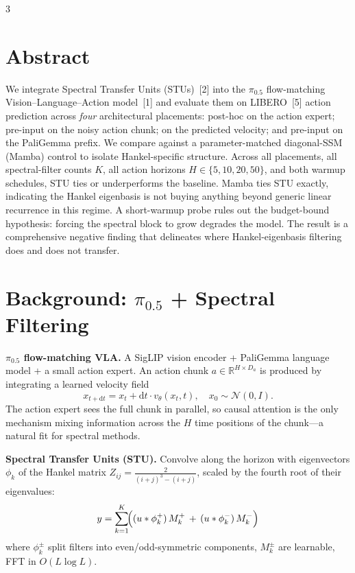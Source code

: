 \documentclass[landscape]{article}
\begin{document}
\begin{multicols}{3}

\section*{Abstract}

We integrate Spectral Transfer Units (STUs)~[2] into the $\pi_{0.5}$ flow-matching Vision--Language--Action model~[1] and evaluate them on LIBERO~[5] action prediction across \emph{four} architectural placements: post-hoc on the action expert; pre-input on the noisy action chunk; on the predicted velocity; and pre-input on the PaliGemma prefix. We compare against a parameter-matched diagonal-SSM (Mamba) control to isolate Hankel-specific structure. Across all placements, all spectral-filter counts $K$, all action horizons $H \in \{5,10,20,50\}$, and both warmup schedules, STU ties or underperforms the baseline. Mamba ties STU exactly, indicating the Hankel eigenbasis is not buying anything beyond generic linear recurrence in this regime. A short-warmup probe rules out the budget-bound hypothesis: forcing the spectral block to grow degrades the model. The result is a comprehensive negative finding that delineates where Hankel-eigenbasis filtering does and does not transfer.

\section*{Background: $\pi_{0.5}$ + Spectral Filtering}

\textbf{$\pi_{0.5}$ flow-matching VLA.} A SigLIP vision encoder + PaliGemma language model + a small action expert. An action chunk $a \in \mathbb{R}^{H \times D_a}$ is produced by integrating a learned velocity field
$$x_{t+\mathrm{d}t} = x_t + \mathrm{d}t \cdot v_\theta(x_t, t), \quad x_0 \sim \mathcal{N}(0, I).$$
The action expert sees the full chunk in parallel, so causal attention is the only mechanism mixing information across the $H$ time positions of the chunk---a natural fit for spectral methods.

\textbf{Spectral Transfer Units (STU).} Convolve along the horizon with eigenvectors $\phi_k$ of the Hankel matrix $Z_{ij} = \frac{2}{(i+j)^3 - (i+j)}$, scaled by the fourth root of their eigenvalues:
$$y = \sum_{k=1}^{K} \!\Bigl( (u * \phi_k^+)\, M_k^+ \,+\, (u * \phi_k^-)\, M_k^- \Bigr)$$
where $\phi_k^\pm$ split filters into even/odd-symmetric components, $M_k^\pm$ are learnable, FFT in $O(L \log L)$.


\end{multicols}
\end{document}
